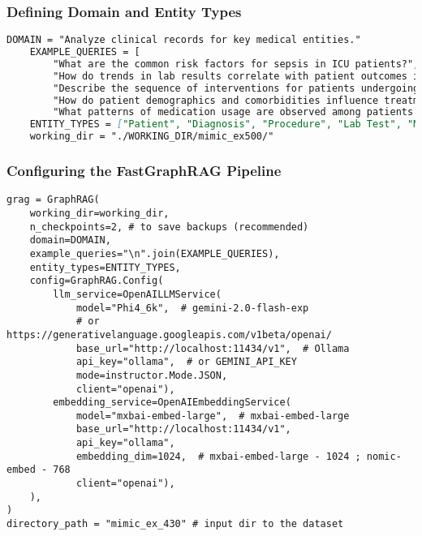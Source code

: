 \begin{frame}[fragile]\frametitle{Defining Domain and Entity Types}
    \begin{lstlisting}[language=markdown]
    DOMAIN = "Analyze clinical records for key medical entities."
	EXAMPLE_QUERIES = [
		"What are the common risk factors for sepsis in ICU patients?",
		"How do trends in lab results correlate with patient outcomes in cases of acute kidney injury?",
		"Describe the sequence of interventions for patients undergoing major cardiac surgery.",
		"How do patient demographics and comorbidities influence treatment decisions in the ICU?",
		"What patterns of medication usage are observed among patients with chronic obstructive pulmonary disease (COPD)?"]	
    ENTITY_TYPES = ["Patient", "Diagnosis", "Procedure", "Lab Test", "Medication", "Outcome", "Unknown"]
    working_dir = "./WORKING_DIR/mimic_ex500/"
    \end{lstlisting}
\end{frame}

\begin{frame}[fragile]\frametitle{Configuring the FastGraphRAG Pipeline}
    \begin{lstlisting}
grag = GraphRAG(
    working_dir=working_dir,
    n_checkpoints=2, # to save backups (recommended)
    domain=DOMAIN,
    example_queries="\n".join(EXAMPLE_QUERIES),
    entity_types=ENTITY_TYPES,
    config=GraphRAG.Config(
        llm_service=OpenAILLMService(
            model="Phi4_6k",  # gemini-2.0-flash-exp
            # or https://generativelanguage.googleapis.com/v1beta/openai/
            base_url="http://localhost:11434/v1",  # Ollama
            api_key="ollama",  # or GEMINI_API_KEY
            mode=instructor.Mode.JSON,
            client="openai"),
        embedding_service=OpenAIEmbeddingService(
            model="mxbai-embed-large",  # mxbai-embed-large
            base_url="http://localhost:11434/v1",
            api_key="ollama",
            embedding_dim=1024,  # mxbai-embed-large - 1024 ; nomic-embed - 768
            client="openai"),
    ),
)
directory_path = "mimic_ex_430" # input dir to the dataset
    \end{lstlisting}
\end{frame}


